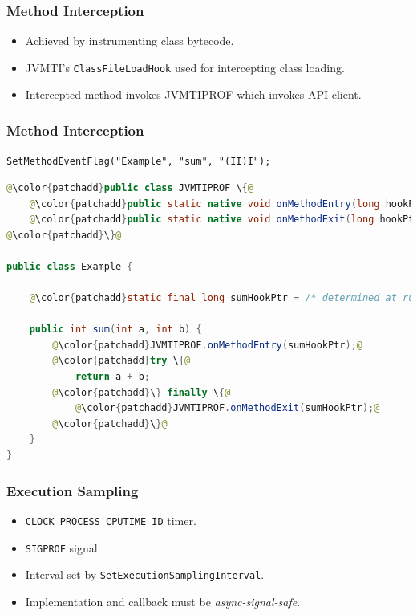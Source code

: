 \documentclass{beamer}
\begin{document}
\begin{frame}
\frametitle{Method Interception}
\begin{itemize}
\item Achieved by instrumenting class bytecode.
\item JVMTI's \lstinline{ClassFileLoadHook} used for intercepting class loading.
\item Intercepted method invokes JVMTIPROF which invokes API client.
\end{itemize}
\end{frame}

\begin{frame}[fragile]
\frametitle{Method Interception}
\centering
\lstinline{SetMethodEventFlag("Example", "sum", "(II)I");}
\medskip
\begin{lstlisting}[language=Java,frame=tbrl,escapechar=@,basicstyle=\tiny,xleftmargin=0.2\textwidth,xrightmargin=0.2\textwidth]
@\color{patchadd}public class JVMTIPROF \{@
    @\color{patchadd}public static native void onMethodEntry(long hookPtr);@
    @\color{patchadd}public static native void onMethodExit(long hookPtr);@
@\color{patchadd}\}@

public class Example {

    @\color{patchadd}static final long sumHookPtr = /* determined at runtime */;@

    public int sum(int a, int b) {
        @\color{patchadd}JVMTIPROF.onMethodEntry(sumHookPtr);@
        @\color{patchadd}try \{@
            return a + b;
        @\color{patchadd}\} finally \{@
            @\color{patchadd}JVMTIPROF.onMethodExit(sumHookPtr);@
        @\color{patchadd}\}@
    }
}
\end{lstlisting}
\end{frame}

\begin{frame}
\frametitle{Execution Sampling}
\begin{itemize}
\item \lstinline{CLOCK_PROCESS_CPUTIME_ID} timer.
\item \lstinline{SIGPROF} signal.
\item Interval set by \lstinline{SetExecutionSamplingInterval}.
\item Implementation and callback must be \emph{async-signal-safe}.
\end{itemize}
\end{frame}
\end{document}
